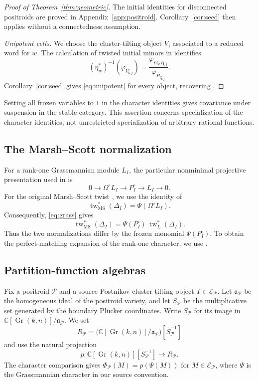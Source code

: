 \documentclass[11pt]{amsart}
\numberwithin{equation}{section}
\theoremstyle{definition}
\theoremstyle{remark}
\newcommand{\op}[1]{\operatorname{#1}}
\newcommand{\E}{\mathcal E}
\newcommand{\Pcal}{\mathcal P}
\newcommand{\kk}{\mathbb C}
\newcommand{\Gr}{\op{Gr}}
\newcommand{\tw}{\op{tw}}
\begin{document}
\begin{proof}[Proof of Theorem~\ref{thm:geometric}]
The initial identities for disconnected positroids are proved in
Appendix~\ref{app:positroid}. Corollary~\ref{cor:seed} then applies
without a connectedness assumption.

\smallskip\noindent\emph{Unipotent cells.}
We choose the cluster-tilting object $V_{\mathbf i}$ associated to a
reduced word for $w$. The calculation of twisted initial minors in
\cite[Section~9.3]{GLS12} identifies
\[ (\eta_w^*)^{-1}(\varphi_{V_{\mathbf i,j}}) =\frac{\varphi_{\Omega_wV_{\mathbf i,j}}} {\varphi_{P_{V_{\mathbf i,j}}}}. \]
Corollary~\ref{cor:seed} gives \eqref{eq:unipotent} for every object,
recovering \cite[Theorem~6]{GLS12}.
\end{proof}

Setting all frozen variables to $1$ in the character identities gives
covariance under suspension in the stable category. This assertion concerns
specialization of the character identities, not unrestricted specialization
of arbitrary rational functions.

\subsection*{The Marsh--Scott normalization}
For a rank-one Grassmannian module $L_I$, the particular nonminimal
projective presentation used in \cite[Sections~9 and 11]{CKP24} is
\[ 0\longrightarrow\Omega^\circ L_I\longrightarrow P_I^\circ \longrightarrow L_I\longrightarrow0. \]
For the original Marsh--Scott twist \cite{MSc}, we use the identity
of \cite[equation~(11.2)]{CKP24}
\[ \tw_{\mathrm{MS}}^*(\Delta_I)=\Psi(\Omega^\circ L_I). \]
Consequently, \eqref{eq:grass} gives
\[ \tw_{\mathrm{MS}}^*(\Delta_I) =\Psi(P_I^\circ)\,\tw_L^*(\Delta_I). \]
Thus the two normalizations differ by the frozen monomial
$\Psi(P_I^\circ)$. To obtain the perfect-matching expansion of the
rank-one character, we use \cite[Theorem~10.3]{CKP24}.

\subsection{Partition-function algebras}\label{subsec:partition-algebras}
Fix a positroid $\Pcal$ and a source Postnikov cluster-tilting object
$T\in\E_\Pcal$. Let $\mathfrak a_\Pcal$ be the homogeneous ideal of the
positroid variety, and let $S_\Pcal$ be the multiplicative set
generated by the boundary Pl\"ucker coordinates. Write $\overline S_\Pcal$
for its image in $\kk[\Gr(k,n)]/\mathfrak a_\Pcal$. We set
\[ R_\Pcal=\bigl(\kk[\Gr(k,n)]/\mathfrak a_\Pcal\bigr)[\overline S_\Pcal^{-1}] \]
and use the natural projection
\[ p:\kk[\Gr(k,n)][S_\Pcal^{-1}]\longrightarrow R_\Pcal. \]
The character comparison \cite[Proposition~4.1 and Corollary~4.2]{JRS26}
gives $\Phi_\Pcal(M)=p(\Psi(M))$ for $M\in\E_\Pcal$, where
$\Psi$ is the Grassmannian character in our source convention.
\end{document}
